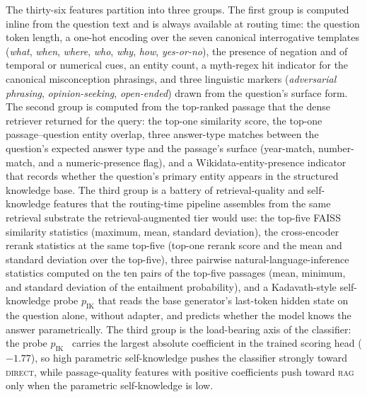 The thirty-six features partition into three groups. The first group is computed inline from the question text and is always available at routing time: the question token length, a one-hot encoding over the seven canonical interrogative templates (\emph{what}, \emph{when}, \emph{where}, \emph{who}, \emph{why}, \emph{how}, \emph{yes-or-no}), the presence of negation and of temporal or numerical cues, an entity count, a myth-regex hit indicator for the canonical misconception phrasings, and three linguistic markers (\emph{adversarial phrasing}, \emph{opinion-seeking}, \emph{open-ended}) drawn from the question's surface form. The second group is computed from the top-ranked passage that the dense retriever returned for the query: the top-one similarity score, the top-one passage--question entity overlap, three answer-type matches between the question's expected answer type and the passage's surface (year-match, number-match, and a numeric-presence flag), and a Wikidata-entity-presence indicator that records whether the question's primary entity appears in the structured knowledge base. The third group is a battery of retrieval-quality and self-knowledge features that the routing-time pipeline assembles from the same retrieval substrate the retrieval-augmented tier would use: the top-five FAISS similarity statistics (maximum, mean, standard deviation), the cross-encoder rerank statistics at the same top-five (top-one rerank score and the mean and standard deviation over the top-five), three pairwise natural-language-inference statistics computed on the ten pairs of the top-five passages (mean, minimum, and standard deviation of the entailment probability), and a Kadavath-style self-knowledge probe $p_{\text{IK}}$ that reads the base generator's last-token hidden state on the question alone, without adapter, and predicts whether the model knows the answer parametrically. The third group is the load-bearing axis of the classifier: the probe $p_{\text{IK}}$~\cite{kadavath2022language} carries the largest absolute coefficient in the trained scoring head ($-1.77$), so high parametric self-knowledge pushes the classifier strongly toward \textsc{direct}, while passage-quality features with positive coefficients push toward \textsc{rag} only when the parametric self-knowledge is low.


